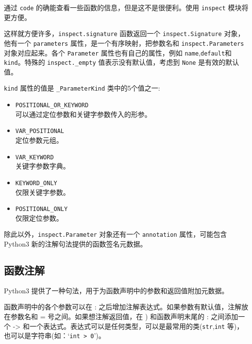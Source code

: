 

通过 \texttt{code} 的确能查看一些函数的信息，但是这不是很便利。使用 \texttt{inspect} 模块将更方便。 



这样就方便许多，\texttt{inspect.signature} 函数返回一个 \texttt{inspect.Signature} 对象，他有一个 \texttt{parameters} 属性，是一个有序映射，把参数名和 \texttt{inspect.Parameters} 对象对应起来。各个 \texttt{Parameter} 属性也有自己的属性，例如 \texttt{name},\texttt{default}和 \texttt{kind}。特殊的 \texttt{inspect.\_empty} 值表示没有默认值，考虑到 \texttt{None} 是有效的默认值。

\texttt{kind} 属性的值是 \texttt{\_ParameterKind} 类中的5个值之一:
\begin{itemize}
    \item \texttt{POSITIONAL\_OR\_KEYWORD} \\
    可以通过定位参数和关键字参数传入的形参。
    \item \texttt{VAR\_POSITIONAL} \\
    定位参数元组。
    \item \texttt{VAR\_KEYWORD} \\
    关键字参数字典。 
    \item \texttt{KEYWORD\_ONLY} \\
    仅限关键字参数。
    \item \texttt{POSITIONAL\_ONLY} \\
    仅限定位参数。
\end{itemize}

除此以外，\texttt{inspect.Parameter} 对象还有一个 \texttt{annotation} 属性，可能包含 Python3 新的注解句法提供的函数签名元数据。

\subsection{函数注解}

Python3 提供了一种句法，用于为函数声明中的参数和返回值附加元数据。



函数声明中的各个参数可以在 : 之后增加注解表达式。如果参数有默认值，注解放在参数名和 = 号之间。如果想注解返回值，在 ) 和函数声明末尾的 : 之间添加一个 -> 和一个表达式。表达式可以是任何类型，可以是最常用的类(\texttt{str},\texttt{int} 等)，也可以是字符串(如：`\texttt{int > 0}')。

